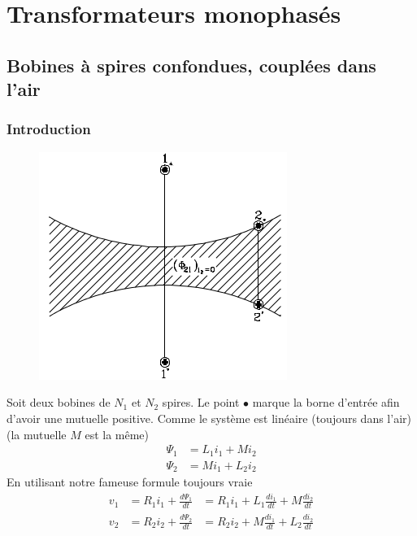\newpage
\section{Transformateurs monophasés}
	\subsection{Bobines à spires confondues, couplées dans l'air}
		\subsubsection{Introduction}
				\begin{figure}
		\vspace{-27mm}
		\includegraphics[scale=0.37]{ch3/image8.png}
		\end{figure}
		Soit deux bobines de $N_1$ et $N_2$ spires. Le point $\bullet$ marque 
		la borne d'entrée afin d'avoir une mutuelle positive. Comme le 
		système est linéaire (toujours dans l'air)(la mutuelle $M$ est la même)
		\begin{equation}
		\begin{array}{ll}
		\Psi_1 &= L_1i_1 + Mi_2\\
		\Psi_2 &= Mi_1 + L_2i_2
		\end{array}
		\end{equation}
		En utilisant notre fameuse formule toujours vraie
		\begin{equation}
		\begin{array}{lll}
		v_1 &= R_1i_1 + \frac{d\Psi_1}{dt} &= R_1i_1 + L_1\frac{di_1}{dt}+M\frac{
		di_2}{dt}\\
		v_2 &= R_2i_2 + \frac{d\Psi_2}{dt} &= R_2i_2 + M\frac{di_1}{dt}+L_2\frac{
		di_2}{dt}
		\end{array}
		\end{equation}
